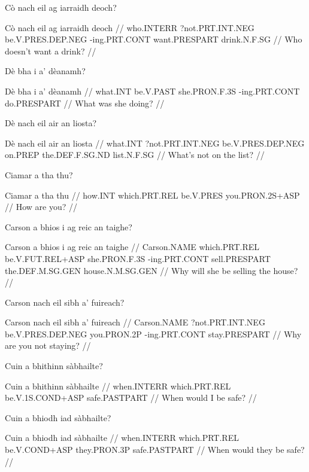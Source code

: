 \documentclass[a4paper,10pt]{article}
\begin{document}
\ex
\begingl
\glpre Cò nach eil ag iarraidh deoch? 

\vspace{4mm}
\gla Cò nach eil ag iarraidh deoch  //
\glb who.INTERR ?not.PRT.INT.NEG be.V.PRES.DEP.NEG -ing.PRT.CONT want.PRESPART drink.N.F.SG  //
\glft Who doesn't want a drink? //
\endgl
\xe

\ex
\begingl
\glpre Dè bha i a' dèanamh? 

\vspace{4mm}
\gla Dè bha i a' dèanamh  //
\glb what.INT be.V.PAST she.PRON.F.3S -ing.PRT.CONT do.PRESPART  //
\glft What was she doing? //
\endgl
\xe

\ex
\begingl
\glpre Dè nach eil air an liosta? 

\vspace{4mm}
\gla Dè nach eil air an liosta  //
\glb what.INT ?not.PRT.INT.NEG be.V.PRES.DEP.NEG on.PREP the.DEF.F.SG.ND list.N.F.SG  //
\glft What's not on the list? //
\endgl
\xe

\ex
\begingl
\glpre Ciamar a tha thu? 

\vspace{4mm}
\gla Ciamar a tha thu  //
\glb how.INT which.PRT.REL be.V.PRES you.PRON.2S+ASP  //
\glft How are you? //
\endgl
\xe

\ex
\begingl
\glpre Carson a bhios i ag reic an taighe? 

\vspace{4mm}
\gla Carson a bhios i ag reic an taighe  //
\glb Carson.NAME which.PRT.REL be.V.FUT.REL+ASP she.PRON.F.3S -ing.PRT.CONT sell.PRESPART the.DEF.M.SG.GEN house.N.M.SG.GEN  //
\glft Why will she be selling the house? //
\endgl
\xe

\ex
\begingl
\glpre Carson nach eil sibh a' fuireach? 

\vspace{4mm}
\gla Carson nach eil sibh a' fuireach  //
\glb Carson.NAME ?not.PRT.INT.NEG be.V.PRES.DEP.NEG you.PRON.2P -ing.PRT.CONT stay.PRESPART  //
\glft Why are you not staying? //
\endgl
\xe

\ex
\begingl
\glpre Cuin a bhithinn sàbhailte? 

\vspace{4mm}
\gla Cuin a bhithinn sàbhailte  //
\glb when.INTERR which.PRT.REL be.V.1S.COND+ASP safe.PASTPART  //
\glft When would I be safe? //
\endgl
\xe

\ex
\begingl
\glpre Cuin a bhiodh iad sàbhailte? 

\vspace{4mm}
\gla Cuin a bhiodh iad sàbhailte  //
\glb when.INTERR which.PRT.REL be.V.COND+ASP they.PRON.3P safe.PASTPART  //
\glft When would they be safe? //
\endgl
\xe
\end{document}
